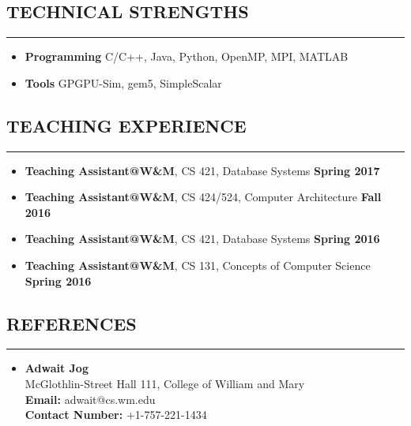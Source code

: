\documentclass[10pt,a4]{article}
\begin{document}

\subsection*{TECHNICAL STRENGTHS}
\hrule
\vspace{0.2cm}
\begin{itemize}
\item {\bf Programming} C/C++, Java, Python, OpenMP, MPI, MATLAB
\item {\bf Tools} GPGPU-Sim, gem5, SimpleScalar
\end{itemize}

\subsection*{TEACHING EXPERIENCE}
\hrule
\vspace{0.2cm}
\begin{itemize}
\item{\bf Teaching Assistant@W\&M}, CS 421, Database Systems \hfill {\bf Spring 2017} 
\item{\bf Teaching Assistant@W\&M}, CS 424/524, Computer Architecture \hfill {\bf Fall 2016} 
\item{\bf Teaching Assistant@W\&M}, CS 421, Database Systems \hfill {\bf Spring 2016} 
\item{\bf Teaching Assistant@W\&M}, CS 131, Concepts of Computer Science \hfill {\bf Spring 2016}


\end{itemize}

\subsection*{REFERENCES}
\hrule
\vspace{0.2cm}
\begin{itemize}
\item 
{\bf Adwait Jog}\\
McGlothlin-Street Hall 111, College of William and Mary\\
{\bf Email:} adwait@cs.wm.edu\\
{\bf Contact Number:} +1-757-221-1434
\end{itemize}
\end{document}
